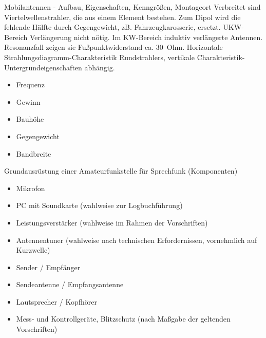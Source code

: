 \documentclass[avery5371,grid,frame,a4paper]{flashcards}
\newcommand{\card}[3]{
  \begin{flashcard}[{\chap} -- #1]{#2}#3\end{flashcard}
}
\begin{document}
\card{37}{Mobilantennen - Aufbau, Eigenschaften, Kenngrößen, Montageort}{
  \small
  Verbreitet sind Viertelwellenstrahler, die aus einem Element bestehen. Zum Dipol wird die fehlende Hälfte durch Gegengewicht, zB. Fahrzeugkarosserie, ersetzt. UKW-Bereich Verlängerung nicht nötig. Im KW-Bereich induktiv verlängerte Antennen. Resonanzfall zeigen sie Fußpunktwiderstand ca. 30~Ohm. Horizontale Strahlungsdiagramm-Charakteristik Rundstrahlers, vertikale Charakteristik-Untergrundeigenschaften abhängig.

  \begin{minipage}{0.45\textwidth}
    \begin{itemize}
      \item Frequenz
      \item Gewinn
      \item Bauhöhe
    \end{itemize}
  \end{minipage}
  \begin{minipage}{0.5\textwidth}
    \begin{itemize}
      \item Gegengewicht
      \item Bandbreite
    \end{itemize}
  \end{minipage}
}
\card{38}{Grundausrüstung einer Amateurfunkstelle für Sprechfunk (Komponenten)}{
  \footnotesize
  \begin{minipage}{0.49\textwidth}
    \begin{itemize}
      \item Mikrofon
      \item PC mit Soundkarte (wahlweise zur Logbuchführung)
      \item Leistungsverstärker (wahlweise im Rahmen der Vorschriften)
      \item Antennentuner (wahlweise nach technischen Erfordernissen, vornehmlich auf Kurzwelle)
    \end{itemize}
  \end{minipage}
  \begin{minipage}{0.5\textwidth}
    \begin{itemize}
      \item Sender / Empfänger
      \item Sendeantenne / Empfangsantenne
      \item Lautsprecher / Kopfhörer
      \item Mess- und Kontrollgeräte, Blitzschutz (nach Maßgabe der geltenden Vorschriften)
    \end{itemize}
  \end{minipage}
}
\end{document}
